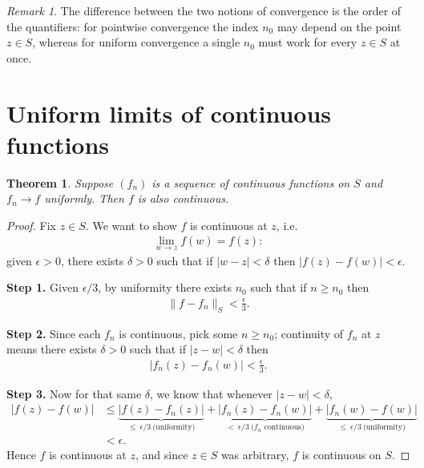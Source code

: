 \documentclass[11pt]{article}
\theoremstyle{plain}
\newtheorem{theorem}{Theorem}[section]
\theoremstyle{definition}
\theoremstyle{remark}
\newtheorem*{remark}{Remark}
\numberwithin{equation}{section}
\newcommand{\be}{\begin{eqnarray}}
\newcommand{\ee}{\end{eqnarray}}
\begin{document}
\begin{remark}
	The difference between the two notions of convergence is the order of the
	quantifiers: for pointwise convergence the index $n_0$ may depend on the
	point $z\in S$, whereas for uniform convergence a single $n_0$ must work
	for every $z\in S$ at once.
\end{remark}
%

\section{Uniform limits of continuous functions}
\begin{theorem}
\label{thm:unif-cts}
Suppose $(f_n)$ is a sequence of continuous functions on $S$ and $f_n\to f$
uniformly. Then $f$ is also continuous.
\end{theorem}

\begin{proof}
Fix $z\in S$. We want to show $f$ is continuous at $z$, i.e.
\be
 \lim_{w\to z}f(w)=f(z):
\ee
given $\epsilon>0$, there exists $\delta>0$ such that if $|w-z|<\delta$ then
$|f(z)-f(w)|<\epsilon$.

\textbf{Step 1.} Given $\epsilon/3$, by uniformity there exists $n_0$ such
that if $n\ge n_0$ then
\be
 \|f-f_n\|_S<\frac\epsilon3.
\ee

\textbf{Step 2.} Since each $f_n$ is continuous, pick some $n\ge n_0$;
continuity of $f_n$ at $z$ means there exists $\delta>0$ such that if
$|z-w|<\delta$ then
\be
 |f_n(z)-f_n(w)|<\frac\epsilon3.
\ee

\textbf{Step 3.} Now for that same $\delta$, we know that whenever
$|z-w|<\delta$,
\begin{align*}
 |f(z)-f(w)|
 &\le\underbrace{|f(z)-f_n(z)|}_{\le\ \epsilon/3\ \text{(uniformity)}}
 +\underbrace{|f_n(z)-f_n(w)|}_{<\ \epsilon/3\ \text{($f_n$ continuous)}}
 +\underbrace{|f_n(w)-f(w)|}_{\le\ \epsilon/3\ \text{(uniformity)}}\\
 &<\epsilon.
\end{align*}
Hence $f$ is continuous at $z$, and since $z\in S$ was arbitrary, $f$ is
continuous on $S$.
\end{proof}
\end{document}

